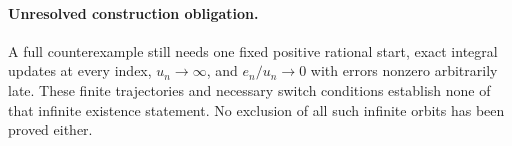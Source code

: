 \documentclass[11pt]{article}
\begin{document}
\paragraph{Unresolved construction obligation.}
A full counterexample still needs one fixed positive rational start,
exact integral updates at every index, $u_n\to\infty$, and
$e_n/u_n\to0$ with errors nonzero arbitrarily late. These finite
trajectories and necessary switch conditions establish none of that
infinite existence statement. No exclusion of all such infinite orbits
has been proved either.
\end{document}
